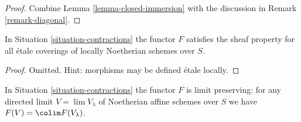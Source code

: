 \begin{proof}
Combine Lemma \ref{lemma-closed-immersion}
with the discussion in Remark \ref{remark-diagonal}.
\end{proof}

\begin{lemma}
\label{lemma-sheaf}
In Situation \ref{situation-contractions} the functor
$F$ satisfies the sheaf property for all \'etale coverings
of locally Noetherian schemes over $S$.
\end{lemma}

\begin{proof}
Omitted. Hint: morphisms may be defined \'etale locally.
\end{proof}

\begin{lemma}
\label{lemma-limit-preserving}
In Situation \ref{situation-contractions} the functor $F$ is limit preserving:
for any directed limit $V = \lim V_\lambda$ of Noetherian affine schemes
over $S$ we have $F(V) = \colim F(V_\lambda)$.
\end{lemma}

